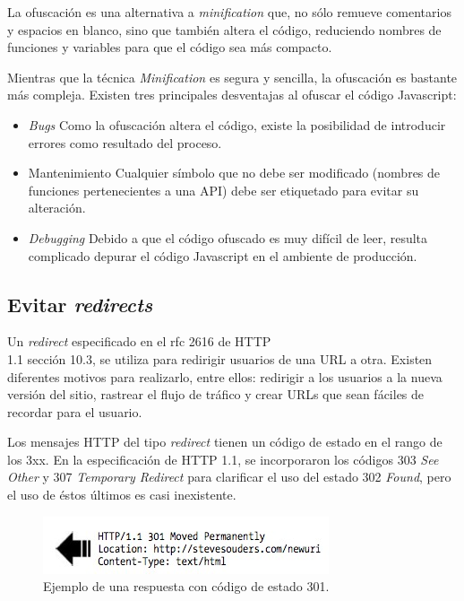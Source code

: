 La ofuscación es una alternativa a \emph{minification} que, no sólo remueve comentarios y
espacios en blanco, sino que también altera el código, reduciendo nombres de funciones y variables para que el código sea más compacto.

Mientras que la técnica \emph{Minification} es segura y sencilla, la ofuscación es bastante más compleja. Existen tres principales desventajas al ofuscar el código Javascript:
\begin{itemize}
\item \emph{Bugs}
Como la ofuscación altera el código, existe la posibilidad de introducir errores como resultado del proceso.
\item Mantenimiento
Cualquier símbolo que no debe ser modificado (nombres de funciones pertenecientes a una API) debe ser etiquetado para evitar su alteración.
\item \emph{Debugging}
Debido a que el código ofuscado es muy difícil de leer, resulta complicado depurar el código Javascript en el ambiente de producción.
\end{itemize}

\subsection{Evitar \emph{redirects}}
\label{cap3:reglas:redirects}

Un \emph{redirect} especificado en el rfc 2616 de HTTP\\1.1 \cite{rfc2616} sección 10.3, se utiliza para redirigir usuarios de una URL a otra. Existen diferentes motivos para realizarlo,
entre ellos: redirigir a los usuarios a la nueva versión del sitio, rastrear el flujo de tráfico y crear
URLs que sean fáciles de recordar para el usuario.

Los mensajes HTTP del tipo \emph{redirect} tienen un código de estado en el rango de los 3xx. En la especificación de HTTP 1.1, se incorporaron los códigos 303 \emph{See Other}
y 307 \emph{Temporary Redirect} para clarificar el uso del estado 302 \emph{Found}, pero el uso de éstos últimos es casi inexistente.

\begin{figure}[h!]
\centering
\includegraphics[scale=0.5]{figuras/hpws/redirect.jpg}
	\caption{Ejemplo de una respuesta con código de estado 301.}
    \label{fig.redirect}
\end{figure}


